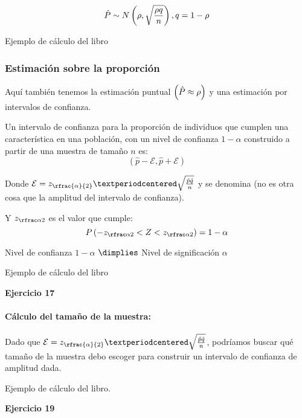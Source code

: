 \[\hat{P} \sim N\left(\rho,\sqrt{\frac{\rho q}{n}}\right), q=1-\rho\]

\begin{example}
Ejemplo de cálculo del libro
\end{example}

\subsubsection{Estimación sobre la proporción}

Aquí también tenemos la estimación puntual $\left(\hat{P} \approx \rho\right)$ y una estimación por intervalos de confianza.


\begin{prop}

Un intervalo de confianza para la proporción de individuos que cumplen una característica en una población, con un nivel de confianza $1-\alpha$ construido a partir de una muestra de tamaño $n$ es:
\[\left(\hat{p} - \mathcal{E} , \hat{p} + \mathcal{E}\right)\]



Donde $\mathcal{E} = z_{\rfrac{\alpha}{2}}·\sqrt{\frac{\hat{p}\hat{q}}{n}}$ y se denomina  (no es otra cosa que la amplitud del intervalo de confianza).

Y $\zalfamedios$ es el valor que cumple:
\[ P\left( -\zalfamedios < Z < \zalfamedios\right) = 1-\alpha\]

\obs Nivel de confianza $1-\alpha$ $\dimplies$ Nivel de significación $\alpha$
\end{prop}

\begin{example}
Ejemplo de cálculo del libro
\end{example}

\textbf{Ejercicio 17}

\paragraph{Cálculo del tamaño de la muestra: } Dado que $\mathcal{E} = z_{\rfrac{\alpha}{2}}·\sqrt{\frac{\hat{p}\hat{q}}{n}}$, podríamos buscar qué tamaño de la muestra debo escoger para construir un intervalo de confianza de amplitud dada.

\begin{example}
Ejemplo de cálculo del libro.
\end{example}

\textbf{Ejercicio 19}